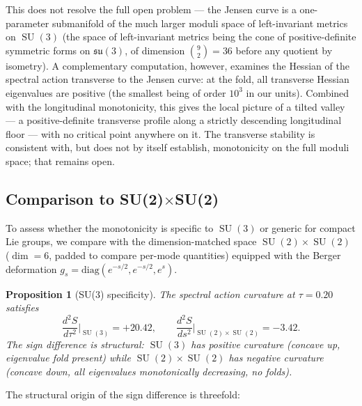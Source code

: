 \documentclass[12pt]{article}
\newtheorem{proposition}[theorem]{Proposition}
\theoremstyle{definition}
\theoremstyle{remark}
\DeclareMathOperator{\SU}{SU}
\begin{document}
This does not resolve the full open problem --- the Jensen curve is a
one-parameter submanifold of the much larger moduli space of
left-invariant metrics on $\SU(3)$ (the space of left-invariant
metrics being the cone of positive-definite symmetric forms on
$\mathfrak{su}(3)$, of dimension $\binom{9}{2} = 36$ before any
quotient by isometry).  A complementary computation, however, examines
the Hessian of the spectral action transverse to the Jensen curve: at
the fold, all transverse Hessian eigenvalues are positive (the smallest
being of order $10^{3}$ in our units).  Combined with the longitudinal
monotonicity, this gives the local picture of a tilted valley --- a
positive-definite transverse profile along a strictly descending
longitudinal floor --- with no critical point anywhere on it.  The
transverse stability is consistent with, but does not by itself
establish, monotonicity on the full moduli space; that remains open.


\subsection{Comparison to \texorpdfstring{SU(2)$\times$SU(2)}{SU(2) x SU(2)}}

To assess whether the monotonicity is specific to $\SU(3)$ or generic
for compact Lie groups, we compare with the dimension-matched space
$\SU(2) \times \SU(2)$ ($\dim = 6$, padded to compare per-mode
quantities) equipped with the Berger deformation
$g_s = \mathrm{diag}(e^{-s/2}, e^{-s/2}, e^s)$.

\begin{proposition}[SU(3) specificity]\label{prop:specificity}
The spectral action curvature at $\tau = 0.20$ satisfies
\begin{equation}
  \frac{d^2 S}{d\tau^2}\bigg|_{\SU(3)} = +20.42,
  \qquad
  \frac{d^2 S}{ds^2}\bigg|_{\SU(2)\times\SU(2)} = -3.42.
\end{equation}
The sign difference is structural: $\SU(3)$ has positive curvature
(concave up, eigenvalue fold present) while $\SU(2) \times \SU(2)$
has negative curvature (concave down, all eigenvalues monotonically
decreasing, no folds).
\end{proposition}

The structural origin of the sign difference is threefold:
\end{document}

